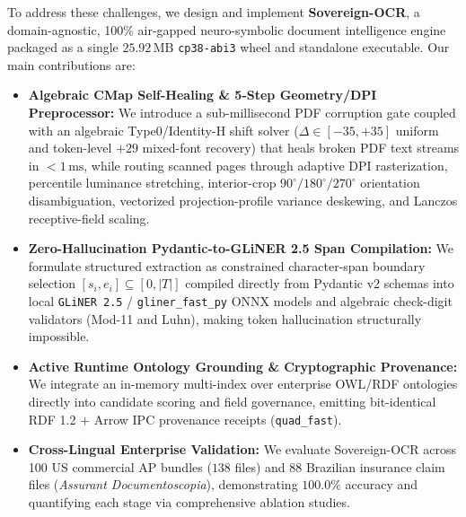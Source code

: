 \documentclass[10pt,twocolumn,letterpaper]{article}
\begin{document}
To address these challenges, we design and implement \textbf{Sovereign-OCR}, a domain-agnostic, 100\% air-gapped neuro-symbolic document intelligence engine packaged as a single $25.92\,\text{MB}$ \texttt{cp38-abi3} wheel and standalone executable. Our main contributions are:
\begin{itemize}[leftmargin=1.3em,itemsep=2pt,topsep=3pt]
    \item \textbf{Algebraic CMap Self-Healing \& 5-Step Geometry/DPI Preprocessor:} We introduce a sub-millisecond PDF corruption gate coupled with an algebraic Type0/Identity-H shift solver ($\Delta \in [-35, +35]$ uniform and token-level $+29$ mixed-font recovery) that heals broken PDF text streams in $<1\,\text{ms}$, while routing scanned pages through adaptive DPI rasterization, percentile luminance stretching, interior-crop $90^\circ/180^\circ/270^\circ$ orientation disambiguation, vectorized projection-profile variance deskewing, and Lanczos receptive-field scaling.
    \item \textbf{Zero-Hallucination Pydantic-to-GLiNER 2.5 Span Compilation:} We formulate structured extraction as constrained character-span boundary selection $[s_i, e_i] \subseteq [0, |T|]$ compiled directly from Pydantic v2 schemas into local \texttt{GLiNER 2.5} / \texttt{gliner\_fast\_py} ONNX models and algebraic check-digit validators (Mod-11 and Luhn), making token hallucination structurally impossible.
    \item \textbf{Active Runtime Ontology Grounding \& Cryptographic Provenance:} We integrate an in-memory multi-index over enterprise OWL/RDF ontologies directly into candidate scoring and field governance, emitting bit-identical RDF 1.2 + Arrow IPC provenance receipts (\texttt{quad\_fast}).
    \item \textbf{Cross-Lingual Enterprise Validation:} We evaluate Sovereign-OCR across 100 US commercial AP bundles ($138$ files) and 88 Brazilian insurance claim files (\emph{Assurant Documentoscopia}), demonstrating $100.0\%$ accuracy and quantifying each stage via comprehensive ablation studies.
\end{itemize}
\end{document}
